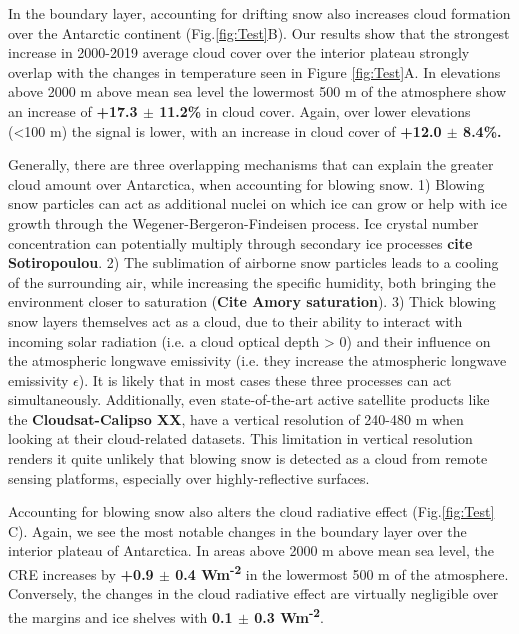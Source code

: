 \documentclass[12pt]{article}
\begin{document}
In the boundary layer, accounting for drifting snow also increases cloud formation over the Antarctic continent (Fig.\ref{fig:Test}B). Our results show that the strongest increase in 2000-2019 average cloud cover over the interior plateau strongly overlap with the changes in temperature seen in Figure \ref{fig:Test}A. In elevations above 2000 m above mean sea level the lowermost 500 m of the atmosphere show an increase of \textbf{+17.3 $\pm$ 11.2\%} in cloud cover. Again, over lower elevations (<100 m) the signal is lower, with an increase in cloud cover of \textbf{+12.0 $\pm$ 8.4\%.}

Generally, there are three overlapping mechanisms that can explain the greater cloud amount over Antarctica, when accounting for blowing snow. 1) Blowing snow particles can act as additional nuclei on which ice can grow or help with ice growth through the Wegener-Bergeron-Findeisen process. Ice crystal number concentration can potentially multiply through secondary ice processes \textbf{cite Sotiropoulou}. 2) The sublimation of airborne snow particles leads to a cooling of the surrounding air, while increasing the specific humidity, both bringing the environment closer to saturation (\textbf{Cite Amory saturation}). 3) Thick blowing snow layers themselves act as a cloud, due to their ability to interact with incoming solar radiation (i.e. a cloud optical depth > 0) and their influence on the atmospheric longwave emissivity (i.e. they increase the atmospheric longwave emissivity $\epsilon$). It is likely that in most cases these three processes can act simultaneously. Additionally, even state-of-the-art active satellite products like the \textbf{Cloudsat-Calipso XX}, have a vertical resolution of 240-480 m when looking at their cloud-related datasets. This limitation in vertical resolution renders it quite unlikely that blowing snow is detected as a cloud from remote sensing platforms, especially over highly-reflective surfaces.

Accounting for blowing snow also alters the cloud radiative effect (Fig.\ref{fig:Test} C). Again, we see the most notable changes in the boundary layer over the interior plateau of Antarctica. In areas above 2000 m above mean sea level, the CRE increases by \textbf{+0.9 $\pm$ 0.4 Wm\textsuperscript{-2}} in the lowermost 500 m of the atmosphere. Conversely, the changes in the cloud radiative effect are virtually negligible over the margins and ice shelves with \textbf{0.1 $\pm$ 0.3 Wm\textsuperscript{-2}}.
\end{document}
